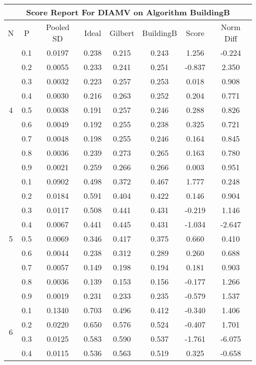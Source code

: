 \documentclass[11pt,a4paper]{report}
\begin{document}
\begin{longtable}{ | c | c || c | c | c | c | c | c | }
\hline
\multicolumn{8}{|c|}{ Score Report For DIAMV on Algorithm BuildingB} \\
\hline
N & P & Pooled SD &  Ideal &  Gilbert & BuildingB  & Score & Norm Diff \\
 \hline
 \hline
 \endhead
\multirow{9}{*}{4} & 0.1 & 0.0197 & 0.238 & 0.215 & 0.243 & 1.256 & -0.224 \\
 & 0.2 & 0.0055 & 0.233 & 0.241 & 0.251 & -0.837 & 2.350 \\
 & 0.3 & 0.0032 & 0.223 & 0.257 & 0.253 & 0.018 & 0.908 \\
 & 0.4 & 0.0030 & 0.216 & 0.263 & 0.252 & 0.204 & 0.771 \\
 & 0.5 & 0.0038 & 0.191 & 0.257 & 0.246 & 0.288 & 0.826 \\
 & 0.6 & 0.0049 & 0.192 & 0.255 & 0.238 & 0.325 & 0.721 \\
 & 0.7 & 0.0048 & 0.198 & 0.255 & 0.246 & 0.164 & 0.845 \\
 & 0.8 & 0.0036 & 0.239 & 0.273 & 0.265 & 0.163 & 0.780 \\
 & 0.9 & 0.0021 & 0.259 & 0.266 & 0.266 & 0.003 & 0.951 \\
 \hline
\multirow{9}{*}{5} & 0.1 & 0.0902 & 0.498 & 0.372 & 0.467 & 1.777 & 0.248 \\
 & 0.2 & 0.0184 & 0.591 & 0.404 & 0.422 & 0.146 & 0.904 \\
 & 0.3 & 0.0117 & 0.508 & 0.441 & 0.431 & -0.219 & 1.146 \\
 & 0.4 & 0.0067 & 0.441 & 0.445 & 0.431 & -1.034 & -2.647 \\
 & 0.5 & 0.0069 & 0.346 & 0.417 & 0.375 & 0.660 & 0.410 \\
 & 0.6 & 0.0044 & 0.238 & 0.312 & 0.289 & 0.260 & 0.688 \\
 & 0.7 & 0.0057 & 0.149 & 0.198 & 0.194 & 0.181 & 0.903 \\
 & 0.8 & 0.0036 & 0.139 & 0.153 & 0.156 & -0.177 & 1.266 \\
 & 0.9 & 0.0019 & 0.231 & 0.233 & 0.235 & -0.579 & 1.537 \\
 \hline
\multirow{9}{*}{6} & 0.1 & 0.1340 & 0.703 & 0.496 & 0.412 & -0.340 & 1.406 \\
 & 0.2 & 0.0220 & 0.650 & 0.576 & 0.524 & -0.407 & 1.701 \\
 & 0.3 & 0.0125 & 0.583 & 0.590 & 0.537 & -1.761 & -6.075 \\
 & 0.4 & 0.0115 & 0.536 & 0.563 & 0.519 & 0.325 & -0.658 \\

\end{longtable}
\end{document}
